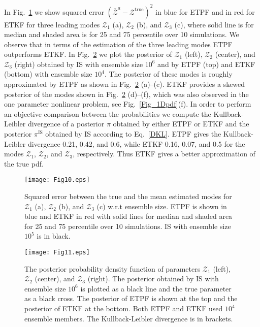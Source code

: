 \documentclass[12, a4paper]{article}
\numberwithin{equation}{section}
\begin{document}
In Fig.~\ref{Fig_HDpar} we show squared error $(\overline{\mathcal{Z}}^a - \mathcal{Z}^\textrm{true})^2$ 
in blue for ETPF and in red for ETKF for three leading modes $\mathcal{Z}_1$ (a), $\mathcal{Z}_2$ (b), and $\mathcal{Z}_3$ (c), 
where solid line is for median and shaded area is for 25 and 75 percentile over 10 simulations. 
We observe that in terms of the estimation of the three leading modes ETPF outperforms ETKF. 
In Fig.~\ref{Fig_HDpdf} we plot the posterior of $\mathcal{Z}_1$ (left),  $\mathcal{Z}_2$ (center), and $\mathcal{Z}_3$ (right) obtained by 
IS with ensemble size $10^6$ and by ETPF (top) and ETKF (bottom) with ensemble size $10^4$. 
The posterior of these modes is roughly approximated by ETPF as shown in Fig.~\ref{Fig_HDpdf} (a)--(c). 
ETKF provides a skewed posterior of the modes shown in Fig.~\ref{Fig_HDpdf} (d)--(f), which was also observed in the one parameter nonlinear problem, 
see Fig.~\ref{Fig_1Dpdf}(f). In order to perform an objective comparison between the probabilities we compute the Kullback-Leibler divergence of a 
posterior $\pi$ obtained by either ETPF or ETKF and the posterior $\pi^\textrm{IS}$ obtained by IS according to Eq.~\eqref{DKL}.
ETPF gives the Kullback-Leibler divergence 0.21, 0.42, and 0.6, while ETKF 0.16, 0.07, and 0.5 for the
modes $\mathcal{Z}_1$, $\mathcal{Z}_2$, and $\mathcal{Z}_3$, respectively. Thus ETKF gives a better approximation of the true pdf. 
\begin{figure} [t]
	\centering		
	\texttt{[image: Fig10.eps]}	
	\caption{Squared error between the true and the mean estimated modes for $\mathcal{Z}_1$ (a), $\mathcal{Z}_2$ (b), and $\mathcal{Z}_3$ (c) w.r.t ensemble size. ETPF is shown in blue and ETKF in red with solid lines for median and shaded area for 25 and 75 percentile over 10 simulations. IS with ensemble size $10^5$ is in black.}	\label{Fig_HDpar}
\end{figure}  
\begin{figure} [t]
	\centering		
	\texttt{[image: Fig11.eps]}	
	\caption{The posterior probability density function of parameters  $\mathcal{Z}_1$ (left),  $\mathcal{Z}_2$ (center), and $\mathcal{Z}_3$ (right). The posterior obtained by IS with ensemble size $10^6$ is plotted as a black line and the true parameter as a black cross. The posterior of ETPF is shown at the top and the posterior of ETKF at the bottom. Both ETPF and ETKF used $10^4$ ensemble members. The Kullback-Leibler divergence is in brackets.}	
	\label{Fig_HDpdf}
\end{figure}  
\end{document}

